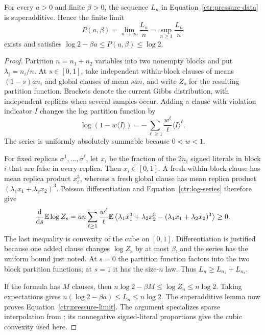 \begin{lemma}
\label{ctr:pressure}
For every $a>0$ and finite $\beta>0$, the sequence $L_n$ in
Equation~\eqref{ctr:pressure-data} is superadditive.  Hence the finite limit
\begin{equation}
 P(a,\beta)=\lim_{n\to\infty}\frac{L_n}{n}
           =\sup_{n\ge1}\frac{L_n}{n}
 \label{ctr:pressure-limit}
\end{equation}
exists and satisfies $\log2-\beta a\le P(a,\beta)\le\log2$.
\end{lemma}

\begin{proof}
Partition $n=n_1+n_2$ variables into two nonempty blocks and put
$\lambda_i=n_i/n$.  At $s\in[0,1]$, take independent within-block clauses
of means $(1-s)an_i$ and global clauses of mean $san$, and write $Z_s$ for
the resulting partition function.  Brackets denote the
current Gibbs distribution, with independent replicas when several samples
occur.  Adding a clause with violation indicator $I$ changes the log partition
function by
\begin{equation}
 \log(1-w\langle I\rangle)
 =-\sum_{\ell\ge1}\frac{w^\ell}{\ell}\langle I\rangle^\ell.
 \label{ctr:log-series}
\end{equation}
The series is uniformly absolutely summable because $0<w<1$.

For fixed replicas $\sigma^1,\ldots,\sigma^\ell$, let $x_i$ be the fraction
of the $2n_i$ signed literals in block $i$ that are false in every replica.
Then $x_i\in[0,1]$.  A fresh within-block clause has mean replica product
$x_i^3$, whereas a fresh global clause has mean replica product
$(\lambda_1x_1+\lambda_2x_2)^3$.  Poisson differentiation and
Equation~\eqref{ctr:log-series} therefore give
\[
 \frac{\mathrm d}{\mathrm ds}\mathbb E\log Z_s
 =an\sum_{\ell\ge1}\frac{w^\ell}{\ell}
   \mathbb E\left\langle
     \lambda_1x_1^3+\lambda_2x_2^3
       -(\lambda_1x_1+\lambda_2x_2)^3
   \right\rangle\ge0.
\]
The last inequality is convexity of the cube on $[0,1]$.  Differentiation
is justified because one added clause changes $\log Z_s$ by at most
$\beta$, and the series has the uniform bound just noted.  At $s=0$ the
partition function factors into the two block partition functions; at $s=1$
it has the size-$n$ law.  Thus $L_n\ge L_{n_1}+L_{n_2}$.

If the formula has $M$ clauses, then
$n\log2-\beta M\le\log Z_n\le n\log2$.  Taking expectations gives
$n(\log2-\beta a)\le L_n\le n\log2$.  The superadditive lemma now proves
Equation~\eqref{ctr:pressure-limit}.  The argument specializes sparse
interpolation from \cite{BGT2013}; its nonnegative signed-literal proportions
give the cubic convexity used here.
\end{proof}

